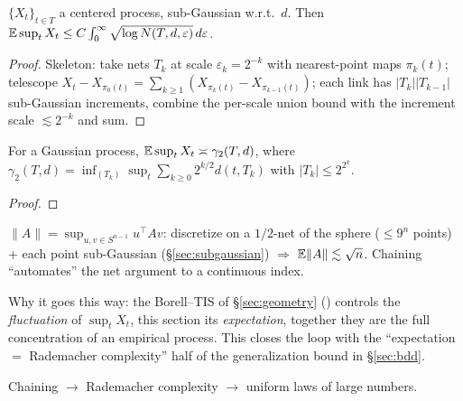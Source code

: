 
\begin{theorem}\label{thm:dudley}
$\{X_t\}_{t\in T}$ a centered process, sub-Gaussian w.r.t.\ $d$. Then
$\mathbb E\sup_{t}X_t\le C\int_0^{\infty}\sqrt{\log N(T,d,\varepsilon)}\,d\varepsilon$.
\end{theorem}
\begin{proof}
Skeleton: take nets $T_k$ at scale $\varepsilon_k=2^{-k}$ with nearest-point maps $\pi_k(t)$; telescope
$X_t-X_{\pi_0(t)}=\sum_{k\ge1}(X_{\pi_k(t)}-X_{\pi_{k-1}(t)})$; each link has $|T_k||T_{k-1}|$ sub-Gaussian increments,
combine the per-scale union bound with the increment scale $\lesssim 2^{-k}$ and sum.
\end{proof}

\begin{theorem}\label{thm:generic-chaining}
For a Gaussian process, $\mathbb E\sup_t X_t\asymp\gamma_2(T,d)$, where
$\gamma_2(T,d)=\inf_{(T_k)}\sup_t\sum_{k\ge0}2^{k/2}d(t,T_k)$ with $|T_k|\le 2^{2^k}$.
\end{theorem}
\begin{proof}\end{proof}

\begin{example}\label{ex:operator-norm}
$\|A\|=\sup_{u,v\in S^{n-1}}u^\top Av$: discretize on a $1/2$-net of the sphere ($\le 9^n$ points) + each point sub-Gaussian
(§\ref{sec:subgaussian}) $\Rightarrow$ $\mathbb E\|A\|\lesssim\sqrt n$. Chaining ``automates'' the net argument to a continuous index.
\end{example}

\begin{strand}
Why it goes this way: the Borell–TIS of §\ref{sec:geometry} () controls the \emph{fluctuation} of $\sup_t X_t$,
this section its \emph{expectation}, together they are the full concentration of an empirical process. This closes the loop
with the ``expectation $=$ Rademacher complexity'' half of the generalization bound in §\ref{sec:bdd}.
\end{strand}

 Chaining $\to$ Rademacher complexity $\to$ uniform laws of large numbers.
